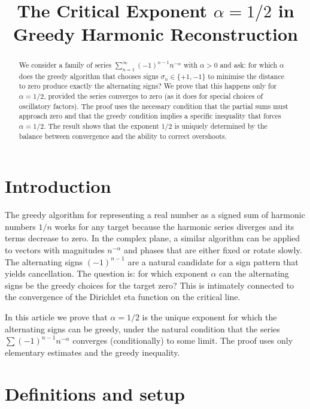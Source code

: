 \documentclass[12pt,a4paper]{article}
\title{The Critical Exponent $\alpha = 1/2$ in Greedy Harmonic Reconstruction}
\author{}
\date{}
\begin{document}
\maketitle

\begin{abstract}
We consider a family of series $\sum_{n=1}^\infty (-1)^{n-1} n^{-\alpha}$ with $\alpha>0$ and ask: for which $\alpha$ does the greedy algorithm that chooses signs $\sigma_n\in\{+1,-1\}$ to minimise the distance to zero produce exactly the alternating signs? We prove that this happens only for $\alpha = 1/2$, provided the series converges to zero (as it does for special choices of oscillatory factors). The proof uses the necessary condition that the partial sums must approach zero and that the greedy condition implies a specific inequality that forces $\alpha=1/2$. The result shows that the exponent $1/2$ is uniquely determined by the balance between convergence and the ability to correct overshoots.
\end{abstract}

\section{Introduction}

The greedy algorithm for representing a real number as a signed sum of harmonic numbers $1/n$ works for any target because the harmonic series diverges and its terms decrease to zero. In the complex plane, a similar algorithm can be applied to vectors with magnitudes $n^{-\alpha}$ and phases that are either fixed or rotate slowly. The alternating signs $(-1)^{n-1}$ are a natural candidate for a sign pattern that yields cancellation. The question is: for which exponent $\alpha$ can the alternating signs be the greedy choices for the target zero? This is intimately connected to the convergence of the Dirichlet eta function on the critical line.

In this article we prove that $\alpha = 1/2$ is the unique exponent for which the alternating signs can be greedy, under the natural condition that the series $\sum (-1)^{n-1} n^{-\alpha}$ converges (conditionally) to some limit. The proof uses only elementary estimates and the greedy inequality.

\section{Definitions and setup}
\end{document}
